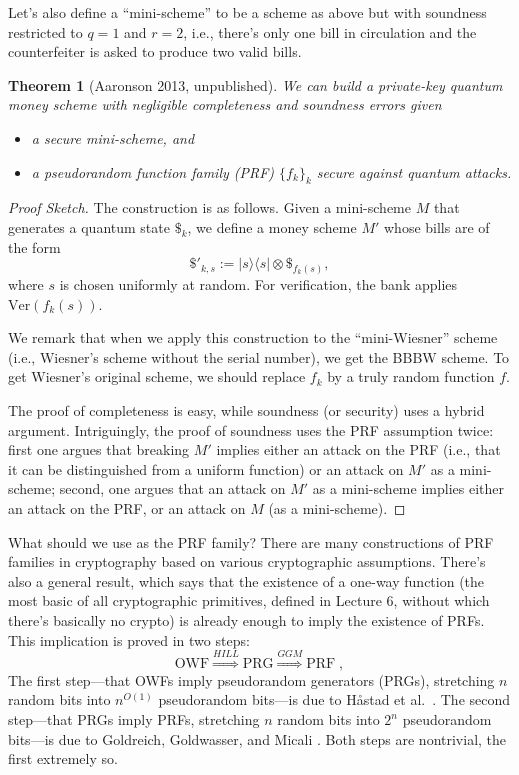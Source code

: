 \documentclass[11pt]{report}
\theoremstyle{plain}
\newtheorem{theorem}{Theorem}[section]
\theoremstyle{definition}
\renewcommand{\bra}[1]{\langle#1|}
\renewcommand{\ket}[1]{|#1\rangle}
\begin{document}
Let's also define a ``mini-scheme'' to be a scheme as above but with soundness restricted to $q=1$ and $r=2$, i.e., there's only one bill in circulation and the counterfeiter is asked to produce two valid bills.

\begin{theorem}[Aaronson 2013, unpublished]
We can build a private-key quantum money scheme with negligible completeness and soundness errors given
\begin{itemize}
\item a secure mini-scheme, and
\item a pseudorandom function family (PRF) $\{f_k\}_k$ secure against quantum attacks.
\end{itemize}
\end{theorem}
\begin{proof}[Proof Sketch]
The construction is as follows. Given a mini-scheme $M$ that generates a quantum state $\$_k$, we define a money scheme $M'$ whose bills are of the form
$$\$'_{k,s} := \ket{s}\bra{s} \otimes \$_{f_k(s)},$$
where $s$ is chosen uniformly at random. For verification, the bank applies $\mathrm{Ver}(f_k(s))$.

We remark that when we apply this construction to the ``mini-Wiesner'' scheme (i.e., Wiesner's scheme without the serial number), we get the BBBW scheme.  To get Wiesner's original scheme, we should replace $f_k$ by a truly random function $f$.

The proof of completeness is easy, while soundness (or security) uses a hybrid argument.
Intriguingly, the proof of soundness uses the PRF assumption twice: first one argues that breaking $M'$ implies either an attack on the PRF (i.e., that it can be distinguished from a uniform function) or an attack on $M'$ as a mini-scheme; second, one argues that an attack on $M'$ as a mini-scheme implies either an attack on the PRF, or an attack on $M$ (as a mini-scheme).
\end{proof}

What should we use as the PRF family? There are many constructions of PRF families in cryptography based on various cryptographic assumptions.
There's also a general result, which says that the existence of a one-way function (the most basic of all cryptographic primitives, defined in Lecture 6, without which there's basically no crypto) is already enough to imply the existence of PRFs. This implication is proved in two steps:
\[
\mathrm{OWF} \stackrel{HILL}{\Longrightarrow} \mathrm{PRG} \stackrel{GGM}{\Longrightarrow} \mathrm{PRF} \; ,
\]
The first step---that OWFs imply pseudorandom generators (PRGs), stretching $n$ random bits into $n^{O(1)}$ pseudorandom bits---is due to H{\aa}stad et al.\ \cite{hill}.  The second step---that PRGs imply PRFs, stretching $n$ random bits into $2^n$ pseudorandom bits---is due to Goldreich, Goldwasser, and Micali \cite{ggm}.  Both steps are nontrivial, the first extremely so.
\end{document}
